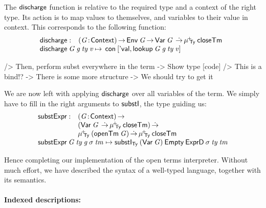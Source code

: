 The $\discharge$ function is relative to the required type and a
context of the right type. Its action is to map values to themselves,
and variables to their value in context. This corresponds to the
following function:
%
\[\stk{
\begin{array}{@{}ll}
\discharge : & \PI{\V{G}}{\Ctxt}
               \Env{\V{G}} \To 
               \Var{\V{G}}{} \DotTo
               \muide{\Ty}{\closeTerm}
\end{array} \\
\begin{array}{@{}l@{\:\mapsto\:\:}l}
\discharge\: \V{G}\: \V{g}\: \V{ty}\: \V{v} &
    \Con{\pair{\SYMBEval}{\lookup{\V{G}}{\V{g}}{\V{ty}}{\V{v}}}{}}
\end{array}
}\]

\begin{wstructure}
            /> Then, perform subst everywhere in the term
                -> Show type [code]
                /> This is a bind!?
                -> There is some more structure 
                    -> We should try to get it
\end{wstructure}

\newcommand{\substH}{\F{substExpr}}

We are now left with applying $\discharge$ over all variables of the
term.  We simply have to fill in the right arguments to $\substI$, the
type guiding us:
%
\[
\stk{
\begin{array}{@{}ll}
\substH  : & \PI{\V{G}}{\Ctxt} \\
           & (\Var{\V{G}}{} \DotTo
              \muide{\Ty}{\closeTerm}) \DotTo \\
          & \muide{\Ty}{(\openTerm{\V{G}})} \DotTo 
            \muide{\Ty}{\closeTerm}
\end{array} \\
\substH\: \V{G}\:
          \V{ty}\:          
          \V{g}\:
          \V{\sigma}\: 
          \V{tm} \mapsto  
\substI_{\Ty}\:
               (\SYMBVar\: \V{G})\: 
               \SYMBEmpty\:
               \HExprD\: 
               \V{\sigma}\:
               \V{ty}\:
               \V{tm}
}\]

Hence completing our implementation of the open terms
interpreter. Without much effort, we have described the syntax of a
well-typed language, together with its semantics.


\paragraph{Indexed descriptions:}

